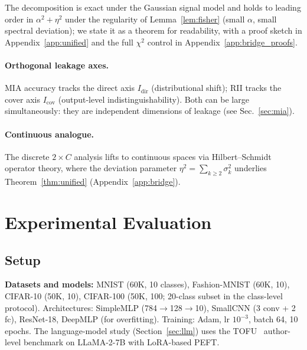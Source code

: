 \documentclass[smallextended]{svjour3}       %
\begin{document}
\begin{remark}
\label{rem:unified_status}
The decomposition is exact under the Gaussian signal model and holds to leading order in $\alpha^2+\eta^2$ under the regularity of Lemma~\ref{lem:fisher} (small $\alpha$, small spectral deviation); we state it as a theorem for readability, with a proof sketch in Appendix~\ref{app:unified} and the full $\chi^2$ control in Appendix~\ref{app:bridge_proofs}.
\end{remark}

\paragraph{Orthogonal leakage axes.}
MIA accuracy tracks the direct axis $I_{\mathrm{dir}}$ (distributional shift); RII tracks the cover axis $I_{\mathrm{cov}}$ (output-level indistinguishability). Both can be large simultaneously: they are independent dimensions of leakage (see Sec.~\ref{sec:mia}).

\paragraph{Continuous analogue.}
The discrete $2\times C$ analysis lifts to continuous spaces via Hilbert--Schmidt operator theory, where the deviation parameter $\eta^2=\sum_{k\ge2}\sigma_k^2$ underlies Theorem~\ref{thm:unified} (Appendix~\ref{app:bridge}).

\section{Experimental Evaluation}
\label{sec:experiments}

\subsection{Setup}

\textbf{Datasets and models:} MNIST (60K, 10 classes), Fashion-MNIST (60K, 10), CIFAR-10 (50K, 10), CIFAR-100 (50K, 100; 20-class subset in the class-level protocol). Architectures: SimpleMLP (784$\to$128$\to$10), SmallCNN (3 conv + 2 fc), ResNet-18, DeepMLP (for overfitting). Training: Adam, lr $10^{-3}$, batch 64, 10 epochs. The language-model study (Section~\ref{sec:llm}) uses the TOFU~\cite{maini2024tofu} author-level benchmark on LLaMA-2-7B with LoRA-based PEFT.
\end{document}
